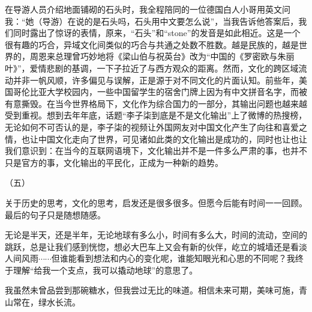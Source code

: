 \documentclass[UTF8]{ctexart}
\begin{document}
在导游人员介绍地面铺砌的石头时，我全程陪同的一位德国白人小哥用英文问我：“她（导游）在说的是石头吗，石头用中文要怎么说”，当我告诉他答案后，我们同时露出了惊讶的表情，原来，“石头”和“stone”的发音是如此相近。这是一个很有趣的巧合，异域文化间类似的巧合与共通之处数不胜数。越是民族的，越是世界的，周恩来总理曾巧妙地将《梁山伯与祝英台》改为“中国的《罗密欧与朱丽叶》”，爱情悲剧的基调，一下子拉近了与西方观众的距离。然而，文化的跨区域流动并非一帆风顺，许多偏见与误解，正是源于对不同文化的片面认知。前些年，美国哥伦比亚大学校园内，一些中国留学生的宿舍门牌上因为有中文拼音名字，而被有意撕毁。在当今世界格局下，文化作为综合国力的一部分，其输出问题也越来越受到重视。想到去年年底，话题“李子柒到底是不是文化输出”上了微博的热搜榜，无论如何不可否认的是，李子柒的视频让外国网友对中国文化产生了向往和喜爱之情，也让中国文化走向了世界，可见诸如此类的文化输出是成功的，同时也让也让我们意识到：在当今的互联网语境下，文化输出并不是一件多么严肃的事，也并不只是官方的事，文化输出的平民化，正成为一种新的趋势。

\begin{center}
    （五）
\end{center}

关于历史的思考，文化的思考，启发还是很多很多。但愿今后能有时间一一回顾。最后的句子只是随想随感。

无论是半天，还是半年，无论地球有多么小，时间有多么大，时间的流动，空间的跳跃，总是让我们感到恍惚，想必大巴车上又会有新的伙伴，屹立的城墙还是看淡人间风雨$\cdots \cdots$但谁能看到想法和内心的变化呢，谁能知眼光和心思的不同呢？我终于理解“给我一个支点，我可以撬动地球”的意思了。

我虽然未曾品尝到那碗糖水，但我尝过无比的味道。相信未来可期，美味可施，青山常在，绿水长流。
\end{document}

